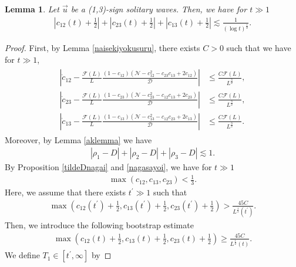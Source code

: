 \documentclass[reqno]{amsart}
\theoremstyle{plain}
\newtheorem{lemma}[theorem]{Lemma}
\theoremstyle{definition}
\numberwithin{equation}{section}
\newcommand{\1}{\mathbbm{1}}
\begin{document}
\begin{lemma}\label{xxx}
Let $\vec{u}$ be a (1,3)-sign solitary waves. Then, we have for $t\gg 1$
\begin{align}\label{naisekrough}
\left|c_{12}(t)+\frac{1}{2}\right|+\left|c_{23}(t)+\frac{1}{2}\right|+\left|c_{13}(t)+\frac{1}{2}\right|\lesssim \frac{1}{(\log{t})^{\frac{1}{2}}}.
\end{align}
\end{lemma}
\begin{proof}
First, by Lemma \ref{naisekiyokusuru}, there exists $C>0$ such that we have for $t\gg 1$,
\begin{align}\label{naisekibsode}
\begin{aligned}
\left|\dot{c}_{12}-\frac{\mathcal{F}(L)}{L}\frac{(1-c_{12})(\mathcal{N}-c_{12}^2-c_{23}c_{13}+2c_{12})}{\mathcal{D}}\right|&\leq \frac{C\mathcal{F}(L)}{L^{\frac{3}{2}}},
\\
\left|\dot{c}_{23}-\frac{\mathcal{F}(L)}{L}\frac{(1-c_{23})(\mathcal{N}-c_{23}^2-c_{12}c_{13}+2c_{23})}{\mathcal{D}}\right|&\leq \frac{C\mathcal{F}(L)}{L^{\frac{3}{2}}},
\\
\left|\dot{c}_{13}-\frac{\mathcal{F}(L)}{L}\frac{(1-c_{13})(\mathcal{N}-c_{13}^2-c_{12}c_{23}+2c_{13})}{\mathcal{D}}\right|&\leq \frac{C\mathcal{F}(L)}{L^{\frac{3}{2}}}.
\end{aligned}
\end{align}
Moreover, by Lemma \ref{aklemma} we have
\begin{align}\label{nagasayoi}
|\rho_1-D|+|\rho_2-D|+|\rho_3-D|\lesssim 1.
\end{align}
By Proposition \ref{tildeDnagai} and \eqref{nagasayoi}, we have for $t\gg 1$
\begin{align}\label{naisekisankaku}
\max{(c_{12},c_{13},c_{23})}<\frac{1}{3}.
\end{align}
Here, we assume that there exists $t^{\prime}\gg 1$ such that 
\begin{align}\label{naisekiass}
\max{\left(c_{12}(t^{\prime})+\frac{1}{2},c_{13}(t^{\prime})+\frac{1}{2},c_{23}(t^{\prime})+\frac{1}{2}\right)}>\frac{45C}{L^{\frac{1}{2}}(t^{\prime})}.
\end{align}
Then, we introduce the following bootstrap estimate
\begin{align}\label{naisekibs1}
\max{\left(c_{12}(t)+\frac{1}{2},c_{13}(t)+\frac{1}{2},c_{23}(t)+\frac{1}{2}\right)}\geq \frac{45C}{L^{\frac{1}{2}}(t)}.
\end{align}
We define $T_1\in [t^{\prime}, \infty]$ by

\end{proof}
\end{document}

